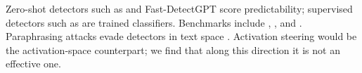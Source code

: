 Zero-shot detectors such as \bino \citep{hans2024binoculars} and Fast-DetectGPT \citep{bao2023fastdetectgpt} score predictability; supervised detectors such as \radar \citep{hu2023radar} are trained classifiers.
Benchmarks include \hcthree \citep{guo2023hc3}, \mage \citep{li2023mage}, and \raid \citep{dugan2024raid}.
Paraphrasing attacks evade detectors in text space \citep{krishna2023dipper,cheng2025adversarial}.
Activation steering would be the activation-space counterpart; we find that along this direction it is not an effective one.
